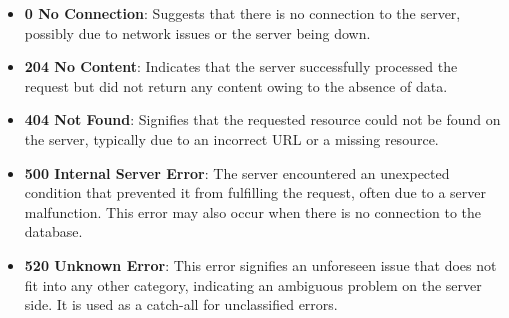 \begin{itemize}
    \item \textbf{0 No Connection}: Suggests that there is no connection to the server, possibly due to network issues or the server being down.
    \item \textbf{204 No Content}: Indicates that the server successfully processed the request but did not return any content owing to the absence of data.
    \item \textbf{404 Not Found}: Signifies that the requested resource could not be found on the server, typically due to an incorrect URL or a missing resource.
    \item \textbf{500 Internal Server Error}: The server encountered an unexpected condition that prevented it from fulfilling the request, often due to a server malfunction. This error may also occur when there is no connection to the database.
    \item \textbf{520 Unknown Error}: This error signifies an unforeseen issue that does not fit into any other category, indicating an ambiguous problem on the server side. It is used as a catch-all for unclassified errors.
\end{itemize}
